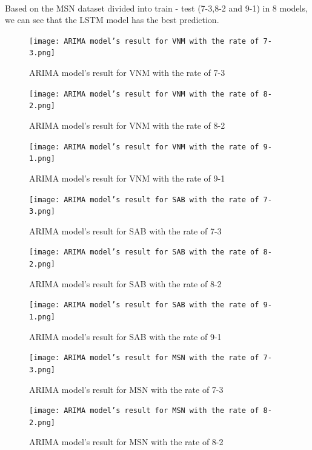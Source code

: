 \documentclass{ieeeojies}
\begin{document}
     \\ Based on the MSN dataset divided into train - test (7-3,8-2 and 9-1) in 8 models, we can see that the LSTM model has the best prediction.
    \begin{figure}[H]
    \centering
    \begin{minipage}{0.23\textwidth}
    \centering
    \texttt{[image: ARIMA model’s result for VNM with the rate of 7-3.png]}
    \caption{ARIMA model’s result for VNM with the rate of 7-3}
    \end{minipage}
    \hfill
    \begin{minipage}{0.23\textwidth}
    \centering
    \texttt{[image: ARIMA model’s result for VNM with the rate of 8-2.png]}
    \caption{ARIMA model’s result for VNM with the rate of 8-2}
    \end{minipage}
\end{figure}
\begin{figure}[H]
    \begin{minipage}{0.23\textwidth}
    \centering
    \texttt{[image: ARIMA model’s result for VNM with the rate of 9-1.png]}
    \caption{ARIMA model’s result for VNM with the rate of 9-1}
    \end{minipage}
    \hfill
    \begin{minipage}{0.23\textwidth}
    \centering
    \texttt{[image: ARIMA model’s result for SAB with the rate of 7-3.png]}
    \caption{ARIMA model’s result for SAB with the rate of 7-3}

    \end{minipage}
   \end{figure}

   \begin{figure}[H]
    \centering
    \begin{minipage}{0.23\textwidth}
    \centering
    \texttt{[image: ARIMA model’s result for SAB with the rate of 8-2.png]}
    \caption{ARIMA model’s result for SAB with the rate of 8-2}
    \end{minipage}
    \hfill
    \begin{minipage}{0.23\textwidth}
    \centering
    \texttt{[image: ARIMA model’s result for SAB with the rate of 9-1.png]}
    \caption{ARIMA model’s result for SAB with the rate of 9-1}
    \end{minipage}
    \end{figure}
    \begin{figure}[H]
    \begin{minipage}{0.23\textwidth}
    \centering
    \texttt{[image: ARIMA model’s result for MSN with the rate of 7-3.png]}
    \caption{ARIMA model’s result for MSN with the rate of 7-3}
    \end{minipage}
    \hfill
    \begin{minipage}{0.23\textwidth}
    \centering
    \texttt{[image: ARIMA model’s result for MSN with the rate of 8-2.png]}
    \caption{ARIMA model’s result for MSN with the rate of 8-2}
    \end{minipage}
   \end{figure}
\end{document}
